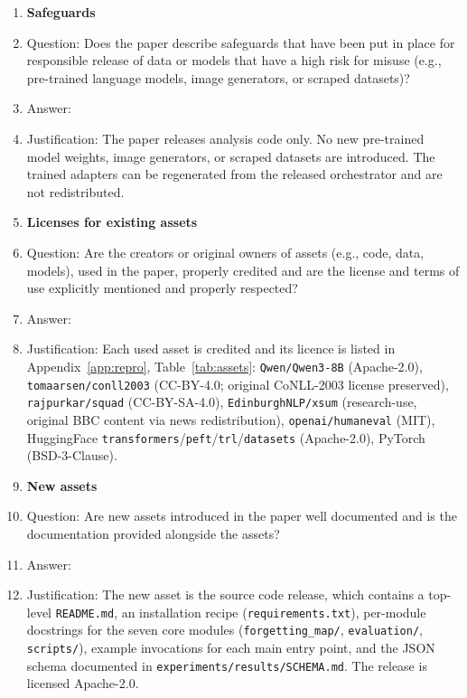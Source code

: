 \begin{enumerate}
\item {\bf Safeguards}
    \item[] Question: Does the paper describe safeguards that have been put in place for responsible release of data or models that have a high risk for misuse (e.g., pre-trained language models, image generators, or scraped datasets)?
    \item[] Answer: \answerNA{}
    \item[] Justification: The paper releases analysis code only. No new pre-trained model weights, image generators, or scraped datasets are introduced. The trained \tglora{} adapters can be regenerated from the released orchestrator and are not redistributed.

\item {\bf Licenses for existing assets}
    \item[] Question: Are the creators or original owners of assets (e.g., code, data, models), used in the paper, properly credited and are the license and terms of use explicitly mentioned and properly respected?
    \item[] Answer: \answerYes{}
    \item[] Justification: Each used asset is credited and its licence is listed in Appendix~\ref{app:repro}, Table~\ref{tab:assets}: \texttt{Qwen/Qwen3-8B} (Apache-2.0), \texttt{tomaarsen/conll2003} (CC-BY-4.0; original CoNLL-2003 license preserved), \texttt{rajpurkar/squad} (CC-BY-SA-4.0), \texttt{EdinburghNLP/xsum} (research-use, original BBC content via news redistribution), \texttt{openai/humaneval} (MIT), HuggingFace \texttt{transformers}/\texttt{peft}/\texttt{trl}/\texttt{datasets} (Apache-2.0), PyTorch (BSD-3-Clause).

\item {\bf New assets}
    \item[] Question: Are new assets introduced in the paper well documented and is the documentation provided alongside the assets?
    \item[] Answer: \answerYes{}
    \item[] Justification: The new asset is the source code release, which contains a top-level \texttt{README.md}, an installation recipe (\texttt{requirements.txt}), per-module docstrings for the seven core modules (\texttt{forgetting\_map/}, \texttt{evaluation/}, \texttt{scripts/}), example invocations for each main entry point, and the \fvs{} JSON schema documented in \texttt{experiments/results/SCHEMA.md}. The release is licensed Apache-2.0.


\end{enumerate}
